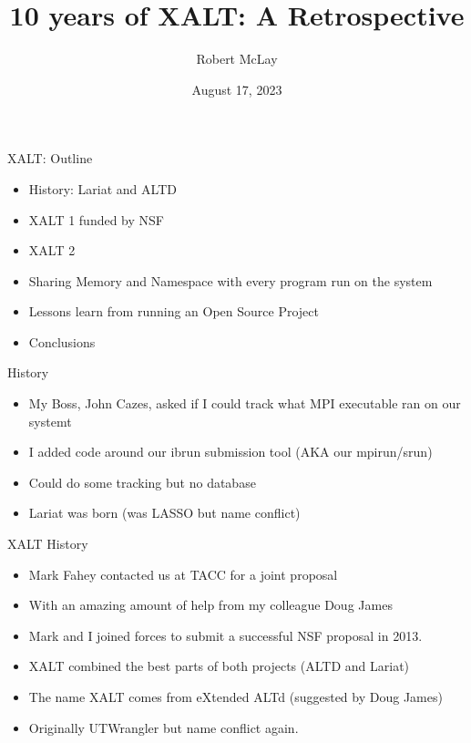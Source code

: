 \documentclass{beamer}
\begin{document}
\title[XALT]{10 years of XALT: A Retrospective}
\author{Robert McLay}
\date{August 17, 2023}

\frame{\titlepage}

\begin{frame}{XALT: Outline}
  \begin{itemize}
    \item History: Lariat and ALTD
    \item XALT 1 funded by NSF
    \item XALT 2
    \item Sharing Memory and Namespace with every program run on the
      system
    \item Lessons learn from running an Open Source Project
    \item Conclusions
  \end{itemize}
\end{frame}

\begin{frame}{History}
  \begin{itemize}
    \item My Boss, John Cazes, asked if I could track what MPI
      executable ran on our systemt
    \item I added code around our ibrun submission tool (AKA our mpirun/srun)
    \item Could do some tracking but no database
    \item Lariat was born (was LASSO but name conflict)
  \end{itemize}
\end{frame}

\begin{frame}{XALT History}
  \begin{itemize}
    \item Mark Fahey contacted us at TACC for a joint proposal
    \item With an amazing amount of help from my colleague Doug James
    \item Mark and I joined forces to submit a successful NSF proposal
      in 2013.
    \item XALT combined the best parts of both projects (ALTD and
      Lariat)
    \item The name XALT comes from eXtended ALTd (suggested by Doug
      James)
    \item Originally UTWrangler but name conflict again.
  \end{itemize}
\end{frame}
\end{document}
